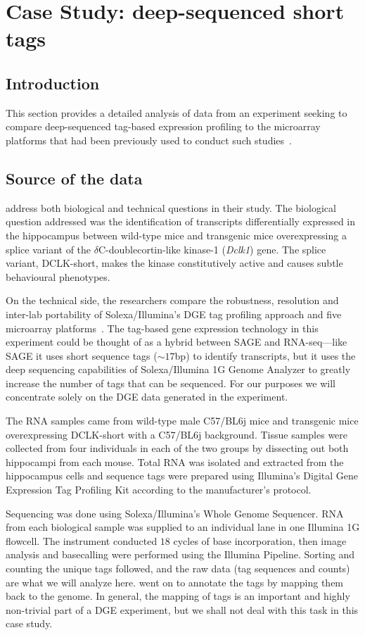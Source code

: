 
\section{Case Study: deep-sequenced short tags}\label{hoen}
\subsection{Introduction}
This section provides a detailed analysis of data from an experiment
seeking to compare deep-sequenced tag-based expression profiling to
the microarray platforms that had been previously used to conduct such
studies~\citep{THoen:2008p9}.

\subsection{Source of the data}
\citet{THoen:2008p9} address both biological and technical questions
in their study. The biological question addressed was the
identification of transcripts differentially expressed in the
hippocampus between wild-type mice and transgenic mice overexpressing
a splice variant of the $\delta$C-doublecortin-like kinase-1
(\emph{Dclk1}) gene. The splice variant, DCLK-short, makes the kinase
constitutively active and causes subtle behavioural phenotypes.

On the technical side, the researchers compare the robustness,
resolution and inter-lab portability of Solexa/Illumina's DGE tag
profiling approach and five microarray
platforms~\citep{THoen:2008p9}. The tag-based gene expression
technology in this experiment could be thought of as a hybrid between
SAGE and RNA-seq---like SAGE it uses short sequence tags ($\sim17$bp)
to identify transcripts, but it uses the deep sequencing capabilities
of Solexa/Illumina 1G Genome Analyzer to greatly increase the number
of tags that can be sequenced. For our purposes we will concentrate
solely on the DGE data generated in the experiment.

The RNA samples came from wild-type male C57/BL6j mice and transgenic
mice overexpressing DCLK-short with a C57/BL6j background. Tissue
samples were collected from four individuals in each of the two groups
by dissecting out both hippocampi from each mouse. Total RNA was
isolated and extracted from the hippocampus cells and sequence tags
were prepared using Illumina's Digital Gene Expression Tag Profiling
Kit according to the manufacturer's protocol.

Sequencing was done using Solexa/Illumina's Whole Genome
Sequencer. RNA from each biological sample was supplied to an
individual lane in one Illumina 1G flowcell. The instrument conducted
$18$ cycles of base incorporation, then image analysis and basecalling
were performed using the Illumina Pipeline. Sorting and counting the
unique tags followed, and the raw data (tag sequences and counts) are
what we will analyze here. \citet{THoen:2008p9} went on to annotate
the tags by mapping them back to the genome. In general, the mapping
of tags is an important and highly non-trivial part of a DGE
experiment, but we shall not deal with this task in this case study.

